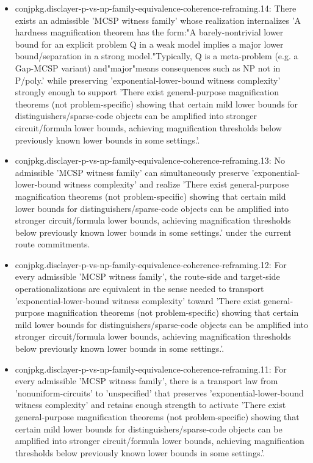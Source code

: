 \documentclass[11pt]{article}
\begin{document}
\begin{itemize}
\item conjpkg.disclayer-p-vs-np-family-equivalence-coherence-reframing.14: There exists an admissible 'MCSP witness family' whose realization internalizes 'A hardness magnification theorem has the form:"A barely-nontrivial lower bound for an explicit problem Q in a weak model implies a major lower bound/separation in a strong model."Typically, Q is a meta-problem (e.g. a Gap-MCSP variant) and"major"means consequences such as NP not in P/poly.' while preserving 'exponential-lower-bound witness complexity' strongly enough to support 'There exist general-purpose magnification theorems (not problem-specific) showing that certain mild lower bounds for distinguishers/sparse-code objects can be amplified into stronger circuit/formula lower bounds, achieving magnification thresholds below previously known lower bounds in some settings.'.
\item conjpkg.disclayer-p-vs-np-family-equivalence-coherence-reframing.13: No admissible 'MCSP witness family' can simultaneously preserve 'exponential-lower-bound witness complexity' and realize 'There exist general-purpose magnification theorems (not problem-specific) showing that certain mild lower bounds for distinguishers/sparse-code objects can be amplified into stronger circuit/formula lower bounds, achieving magnification thresholds below previously known lower bounds in some settings.' under the current route commitments.
\item conjpkg.disclayer-p-vs-np-family-equivalence-coherence-reframing.12: For every admissible 'MCSP witness family', the route-side and target-side operationalizations are equivalent in the sense needed to transport 'exponential-lower-bound witness complexity' toward 'There exist general-purpose magnification theorems (not problem-specific) showing that certain mild lower bounds for distinguishers/sparse-code objects can be amplified into stronger circuit/formula lower bounds, achieving magnification thresholds below previously known lower bounds in some settings.'.
\item conjpkg.disclayer-p-vs-np-family-equivalence-coherence-reframing.11: For every admissible 'MCSP witness family', there is a transport law from 'nonuniform-circuits' to 'unspecified' that preserves 'exponential-lower-bound witness complexity' and retains enough strength to activate 'There exist general-purpose magnification theorems (not problem-specific) showing that certain mild lower bounds for distinguishers/sparse-code objects can be amplified into stronger circuit/formula lower bounds, achieving magnification thresholds below previously known lower bounds in some settings.'.

\end{itemize}
\end{document}
